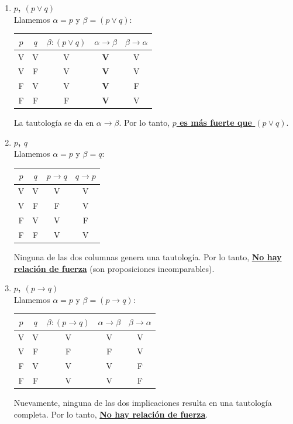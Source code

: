 \begin{enumerate}[label=\textbf{\alph*)}]
    \vspace{0.4cm}
    \item \textbf{$p$, $(p \vee q)$} \\
    Llamemos $\alpha = p$ y $\beta = (p \vee q)$:
    \begin{center}
    \begin{tabular}{|c|c|c|c|c|}
    \hline
    $p$ & $q$ & $\beta : (p \vee q)$ & $\alpha \rightarrow \beta$ & $\beta \rightarrow \alpha$ \\
    \hline
    V & V & V & \textbf{V} & V \\
    V & F & V & \textbf{V} & V \\
    F & V & V & \textbf{V} & F \\
    F & F & F & \textbf{V} & V \\
    \hline
    \end{tabular}
    \end{center}
    La tautología se da en $\alpha \rightarrow \beta$. Por lo tanto, \underline{\textbf{$p$ es más fuerte que $(p \vee q)$}}.

    \vspace{0.4cm}
    \item \textbf{$p$, $q$} \\
    Llamemos $\alpha = p$ y $\beta = q$:
    \begin{center}
    \begin{tabular}{|c|c|c|c|}
    \hline
    $p$ & $q$ & $p \rightarrow q$ & $q \rightarrow p$ \\
    \hline
    V & V & V & V \\
    V & F & F & V \\
    F & V & V & F \\
    F & F & V & V \\
    \hline
    \end{tabular}
    \end{center}
    Ninguna de las dos columnas genera una tautología. Por lo tanto, \underline{\textbf{No hay relación de fuerza}} (son proposiciones incomparables).

    \vspace{0.4cm}
    \item \textbf{$p$, $(p \rightarrow q)$} \\
    Llamemos $\alpha = p$ y $\beta = (p \rightarrow q)$:
    \begin{center}
    \begin{tabular}{|c|c|c|c|c|}
    \hline
    $p$ & $q$ & $\beta : (p \rightarrow q)$ & $\alpha \rightarrow \beta$ & $\beta \rightarrow \alpha$ \\
    \hline
    V & V & V & V & V \\
    V & F & F & F & V \\
    F & V & V & V & F \\
    F & F & V & V & F \\
    \hline
    \end{tabular}
    \end{center}
    Nuevamente, ninguna de las dos implicaciones resulta en una tautología completa. Por lo tanto, \underline{\textbf{No hay relación de fuerza}}.

\end{enumerate}

